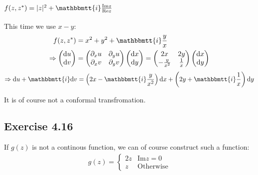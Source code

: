 \documentclass[]{ctexart}
\newcommand{\mi}{\mathbbmtt{i}}
\newcommand{\di}{\mathrm{d}}
\newcommand{\pa}{\partial}
\begin{document}
		\subsubsection{$f(z,z^*)=|z|^2+\mi \frac{\text{Im}z}{\text{Re}z}$}
			This time we use $x-y$:
				\begin{equation*}
				\begin{aligned}
					f(z,z^*)&=x^2+y^2+\mi \frac{y}{x}\\
					\Rightarrow 
					\begin{pmatrix}
						\di u\\
						\di v
					\end{pmatrix}
					&=
					\begin{pmatrix}
						\pa_xu & \pa_yu\\
						\pa_xv & \pa_yv
					\end{pmatrix}
					\begin{pmatrix}
						\di x\\
						\di y
					\end{pmatrix}
					=
					\begin{pmatrix}
						2x & 2y\\
						-\frac{y}{x^2} & \frac{1}{x}
					\end{pmatrix}
					\begin{pmatrix}
						\di x\\
						\di y
					\end{pmatrix}
				\end{aligned}
				\end{equation*}
				\begin{equation*}
				\begin{aligned}
					\Rightarrow \di u+\mi \di v=\left(2x-\mi \frac{y}{x^2}\right)\di x+\left(2y+\mi \frac{1}{x}\right)\di y
				\end{aligned}
				\end{equation*}
			
			It is of course not a conformal transfromation. 
	
	\subsection{Exercise 4.16}
		If $g(z)$ is not a continous function, we can of course construct such a function:
			\begin{equation*}
			\begin{aligned}
				g(z)=
				\begin{cases}
				2z & \text{Im}z=0\\
				z & \text{Otherwise}
				\end{cases}
			\end{aligned}
			\end{equation*} 
		
\end{document}
